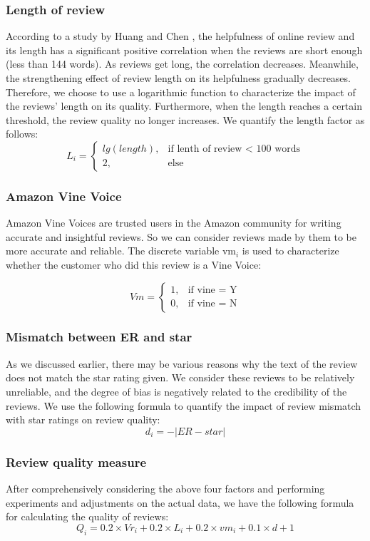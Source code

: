 \documentclass{mcmthesis}
\begin{document}
\subsubsection{Length of review}
According to a study by Huang and Chen \cite{1}, the helpfulness of online review and its length has a significant positive correlation when the reviews are short enough (less than 144 words). As reviews get long, the correlation decreases. Meanwhile, the strengthening effect of review length on its helpfulness gradually decreases. Therefore, we choose to use a logarithmic function to characterize the impact of the reviews' length on its quality. Furthermore, when the length reaches a certain threshold, the review quality no longer increases. We quantify the length factor as follows:
\[
L_{i} =
\begin{cases}  
	 lg (length), &\text{if lenth of review < 100 words} \\
	2, &\text{else}
\end{cases}
\]

\subsubsection{Amazon Vine Voice}
Amazon Vine Voices are trusted users in the Amazon community for writing accurate and insightful reviews. So we can consider reviews made by them to be more accurate and reliable. The discrete variable vm$_{i}$ is used to characterize whether the customer who did this review is a Vine Voice:

\[
Vm = 
\begin{cases}  
	1, &\text{if vine = Y} \\
	0, &\text{if vine = N}
\end{cases}
\]

\subsubsection{Mismatch between ER and star}
As we discussed earlier, there may be various reasons why the text of the review does not match the star rating given. We consider these reviews to be relatively unreliable, and the degree of bias is negatively related to the credibility of the reviews. We use the following formula to quantify the impact of review mismatch with star ratings on review quality:
\[
	d_{i}  = -|ER - star|
\]

\subsubsection{Review quality measure}
After comprehensively considering the above four factors and performing experiments and adjustments on the actual data, we have the following formula for calculating the quality of reviews:
\[
Q_i = 0.2 \times Vr_i + 0.2 \times L_i + 0.2 \times vm_i + 0.1 \times d + 1
\]
\end{document}
